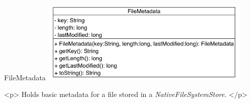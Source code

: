 \begin{XeClass}{FileMetadata}
\includegraphics[width=10cm]{cdig/FileMetadata.png}
     
 <p>
 Holds basic metadata for a file stored in a \emph{NativeFileSystemStore}.
 </p>

\end{XeClass}
